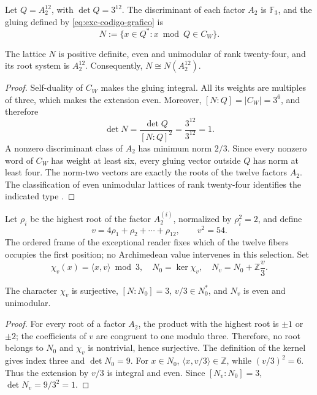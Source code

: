 Let \(Q=A_2^{12}\), with \(\det Q=3^{12}\). The discriminant of each
factor \(A_2\) is \(\mathbb F_3\), and the gluing defined by
\eqref{eq:exc-codigo-grafico} is
\begin{equation}
 N:=\{x\in Q^*:x\bmod Q\in C_W\}.
 \label{eq:exc-niemeier-pegado}
\end{equation}

\begin{theorem}
\label{thm:exc-niemeier}
The lattice \(N\) is positive definite, even and unimodular of rank
twenty-four, and its root system is \(A_2^{12}\). Consequently,
\(N\cong N(A_2^{12})\).
\end{theorem}

\begin{proof}
Self-duality of \(C_W\) makes the gluing integral. All its weights are
multiples of three, which makes the extension even. Moreover,
\([N:Q]=|C_W|=3^6\), and therefore
\[
 \det N=\frac{\det Q}{[N:Q]^2}
 =\frac{3^{12}}{3^{12}}=1.
\]
A nonzero discriminant class of \(A_2\) has minimum norm \(2/3\).
Since every nonzero word of \(C_W\) has weight at least six, every gluing
vector outside \(Q\) has norm at least four. The norm-two
vectors are exactly the roots of the twelve factors \(A_2\). The
classification of even unimodular lattices of rank twenty-four
identifies the indicated type \citep{ConwaySloane1999}.
\end{proof}

Let \(\rho_i\) be the highest root of the factor \(A_2^{(i)}\), normalized by
\(\rho_i^2=2\), and define
\begin{equation}
 v=4\rho_1+\rho_2+\cdots+\rho_{12},
 \qquad v^2=54.
 \label{eq:exc-vector-vecino}
\end{equation}
The ordered frame of the exceptional reader fixes which of the twelve fibers occupies
the first position; no Archimedean value intervenes in this selection.
Set
\begin{equation}
 \chi_v(x)=\langle x,v\rangle\bmod3,
 \quad N_0=\ker\chi_v,
 \quad N_v=N_0+\mathbb Z\frac v3.
 \label{eq:exc-vecino-indice-tres}
\end{equation}

\begin{lemma}
\label{lem:exc-estructura-vecino}
The character \(\chi_v\) is surjective, \([N:N_0]=3\),
\(v/3\in N_0^*\), and \(N_v\) is even and unimodular.
\end{lemma}

\begin{proof}
For every root of a factor \(A_2\), the product with the highest root is
\(\pm1\) or \(\pm2\); the coefficients of \(v\) are congruent to one
modulo three. Therefore, no root belongs to \(N_0\) and \(\chi_v\) is
nontrivial, hence surjective. The definition of the kernel gives index three and
\(\det N_0=9\). For \(x\in N_0\),
\(\langle x,v/3\rangle\in\mathbb Z\), while
\((v/3)^2=6\). Thus the extension by \(v/3\) is integral and even. Since
\([N_v:N_0]=3\),
\(\det N_v=9/3^2=1\).
\end{proof}

